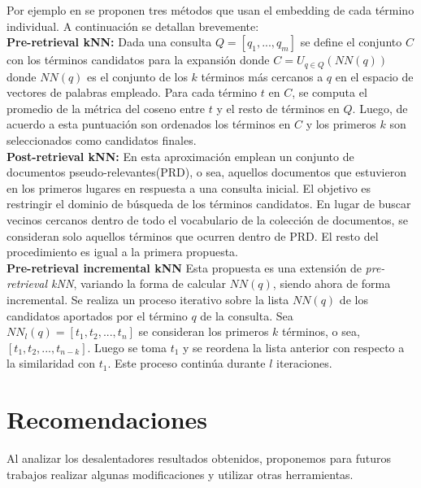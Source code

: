 \documentclass{llncs}
\begin{document}
Por ejemplo en \cite{190} se proponen tres métodos que usan el embedding de cada término individual. A continuación se detallan brevemente:
\\

\textbf{Pre-retrieval kNN: } Dada una consulta $Q = [q_1, ..., q_m]$ se define el conjunto $C$ con los términos candidatos para la expansión donde $C = U_{q \in Q}(NN(q)) $ donde $NN(q)$ es el conjunto de los $k$ términos más cercanos a $q$ en el espacio de vectores de palabras empleado. Para cada término $t$ en $C$, se computa el promedio de la métrica del coseno entre $t$ y el resto de términos en $Q$. Luego, de acuerdo a esta puntuación son ordenados los términos en $C$ y los primeros $k$ son seleccionados como candidatos finales.
\\

\textbf{Post-retrieval kNN: } En esta aproximación emplean un conjunto de documentos pseudo-relevantes(PRD), o sea, aquellos documentos que estuvieron en los primeros lugares en respuesta a una consulta inicial. El objetivo es restringir el dominio de búsqueda de los términos candidatos. En lugar de buscar vecinos cercanos dentro de todo el vocabulario de la colección de documentos, se consideran solo aquellos términos que ocurren dentro de PRD. El resto del procedimiento es igual a la primera propuesta.
\\

\textbf{Pre-retrieval incremental kNN}
Esta propuesta es una extensión de \textit{pre-retrieval kNN}, variando la forma de calcular $NN(q)$, siendo ahora de forma incremental. Se realiza un proceso iterativo sobre la lista $NN(q)$ de los candidatos aportados por el término $q$ de la consulta. Sea $NN_l(q) = [t_1, t_2, ..., t_n]$ se consideran los primeros $k$ términos, o sea, $[t_1, t_2, ..., t_{n-k}]$. Luego se toma $t_1$ y se reordena la lista anterior con respecto a la similaridad con $t_1$. Este proceso continúa durante $l$ iteraciones.

\section{Recomendaciones}

Al analizar los desalentadores resultados obtenidos, proponemos para futuros trabajos realizar algunas modificaciones y utilizar otras herramientas.
\end{document}
